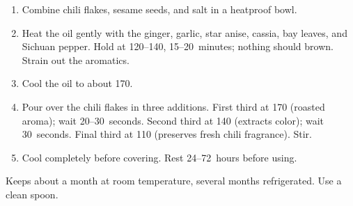 \label{laziyou}

\begin{ingredients}
\end{ingredients}


\begin{recipe}
  \begin{enumerate}

  \item Combine chili flakes, sesame seeds, and salt in a heatproof
    bowl.

  \item Heat the oil gently with the ginger, garlic, star anise,
    cassia, bay leaves, and Sichuan pepper. Hold at
    120--140\degreeC{}, 15--20~minutes; nothing should brown. Strain
    out the aromatics.

  \item Cool the oil to about 170\degreeC.

  \item Pour over the chili flakes in three additions. First third at
    170\degreeC{} (roasted aroma); wait 20--30~seconds. Second third
    at 140\degreeC{} (extracts color); wait 30~seconds. Final third at
    110\degreeC{} (preserves fresh chili fragrance). Stir.

  \item Cool completely before covering. Rest 24--72~hours before
    using.

  \end{enumerate}
\end{recipe}

\notes{} Keeps about a month at room temperature, several months
refrigerated. Use a clean spoon.

